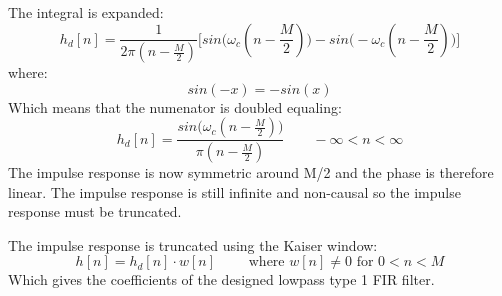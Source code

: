 The integral is expanded:
\begin{equation}
h_d[n]=\frac{1}{2\pi(n-\frac{M}{2})}\bigg[sin\Big(\omega_c(n-\frac{M}{2})\Big)-sin\Big(-\omega_c(n-\frac{M}{2})\Big)\bigg]
\end{equation}
where:
\begin{equation}
sin(-x) = -sin(x)
\end{equation}
Which means that the numenator is doubled equaling:
\begin{equation}
h_d[n]=\frac{sin\Big(\omega_c(n-\frac{M}{2})\Big)}{\pi(n-\frac{M}{2})}\qquad-\infty<n<\infty
\end{equation}
The impulse response is now symmetric around M/2 and the phase is therefore linear. The impulse response is still infinite and non-causal so the impulse response must be truncated.

The impulse response is truncated using the Kaiser window:
\begin{equation}
h[n]=h_d[n]\cdot w[n]\qquad\textrm{ where } w[n]\neq0 \textrm{ for } 0<n<M
\end{equation}
Which gives the coefficients of the designed lowpass type 1 FIR filter. 








